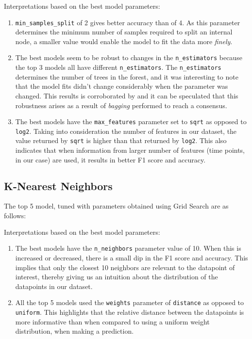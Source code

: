 \documentclass[11pt,a4paper]{article}
\newcommand{\noi}{\noindent}
\begin{document}
\noi
Interpretations based on the best model parameters:
\begin{enumerate}
	\itemsep0em
	\item \texttt{min\_samples\_split} of 2 gives better accuracy than of 4. As this parameter determines the minimum number of samples required to split an internal node, a smaller value would enable the model to fit the data more \textit{finely}.
	\item The best models seem to be robust to changes in the \texttt{n\_estimators} because the top 3 models all have different \texttt{n\_estimators}. The \texttt{n\_estimators} determines the number of trees in the forest, and it was interesting to note that the model fits didn't change considerably when the parameter was changed. This results is corroborated by \cite{cutler2012random} and it can be speculated that this robustness arises as a result of \textit{bagging} performed to reach a consensus.
	\item The best models have the \texttt{max\_features} parameter set to \texttt{sqrt} as opposed to \texttt{log2}. Taking into consideration the number of features in our dataset, the value returned by \texttt{sqrt} is higher than that returned by \texttt{log2}. This also indicates that when information from larger number of features (time points, in our case) are used, it results in better F1 score and accuracy.
\end{enumerate}


\subsection{K-Nearest Neighbors}
The top 5 model, tuned with parameters obtained using Grid Search are as follows:


\noi
Interpretations based on the best model parameters:
\begin{enumerate}
	\itemsep0em
	\item The best models have the \texttt{n\_neighbors} parameter value of 10. When this is increased or decreased, there is a small dip in the F1 score and accuracy. This implies that only the closest 10 neighbors are relevant to the datapoint of interest, thereby giving us an intuition about the distribution of the datapoints in our dataset.
	\item All the top 5 models used the \texttt{weights} parameter of \texttt{distance} as opposed to \texttt{uniform}. This highlights that the relative distance between the datapoints is more informative than when compared to using a uniform weight distribution, when making a prediction.
\end{enumerate}
\end{document}
